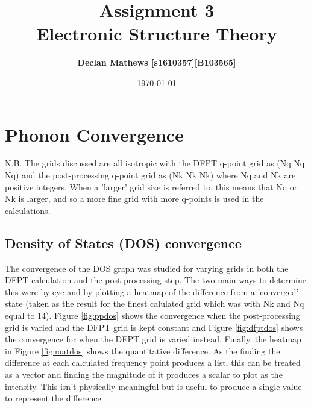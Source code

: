 \documentclass[12pt]{article}
\title{\bf Assignment 3 \\[2ex] 
	\rm\normalsize Electronic Structure Theory}
\date{\today}
\author{\bf Declan Mathews [s1610357][B103565]}
\begin{document}
	\maketitle
	
\section*{Phonon Convergence}

N.B.  The grids discussed are all isotropic with the DFPT q-point grid as (Nq Nq Nq) and the post-processing q-point grid as (Nk Nk Nk) where Nq and Nk are positive integers. When a 'larger' grid size is referred to, this means that Nq or Nk is larger, and so a more fine grid with more q-points is used in the calculations.

\subsection*{Density of States (DOS) convergence}

The convergence of the DOS graph was studied for varying grids in both the DFPT calculation and the post-processing step. The two main ways to determine this were by eye and by plotting a heatmap of the difference from a 'converged' state (taken as the result for the finest calulated grid which was with Nk and Nq equal to 14). Figure \ref{fig:ppdos} shows the convergence when the post-processing grid is varied and the DFPT grid is kept constant and Figure \ref{fig:dfptdos} shows the convergence for when the DFPT grid is varied instead. Finally, the heatmap in Figure \ref{fig:matdos} shows the quantitative difference. As the finding the difference at each calculated frequency point produces a list, this can be treated as a vector and finding the magnitude of it produces a scalar to plot as the intensity. This isn't physically meaningful but is useful to produce a single value to represent the difference.
\end{document}
